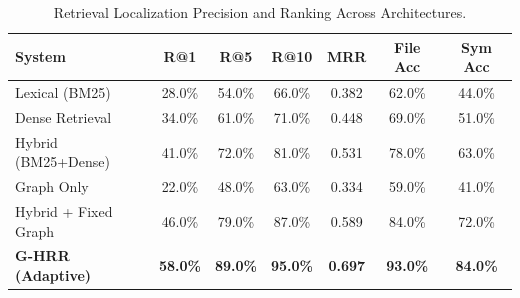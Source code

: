 \begin{table}[t]
\centering
\small
\caption{Retrieval Localization Precision and Ranking Across Architectures.}
\label{tab:localization}
\begin{tabular}{lcccccc}
\toprule
\textbf{System} & \textbf{R@1} & \textbf{R@5} & \textbf{R@10} & \textbf{MRR} & \textbf{File Acc} & \textbf{Sym Acc} \\
\midrule
Lexical (BM25) & 28.0\% & 54.0\% & 66.0\% & 0.382 & 62.0\% & 44.0\% \\
Dense Retrieval & 34.0\% & 61.0\% & 71.0\% & 0.448 & 69.0\% & 51.0\% \\
Hybrid (BM25+Dense) & 41.0\% & 72.0\% & 81.0\% & 0.531 & 78.0\% & 63.0\% \\
Graph Only & 22.0\% & 48.0\% & 63.0\% & 0.334 & 59.0\% & 41.0\% \\
Hybrid + Fixed Graph & 46.0\% & 79.0\% & 87.0\% & 0.589 & 84.0\% & 72.0\% \\
\textbf{G-HRR (Adaptive)} & \textbf{58.0\%} & \textbf{89.0\%} & \textbf{95.0\%} & \textbf{0.697} & \textbf{93.0\%} & \textbf{84.0\%} \\
\bottomrule
\end{tabular}
\end{table}